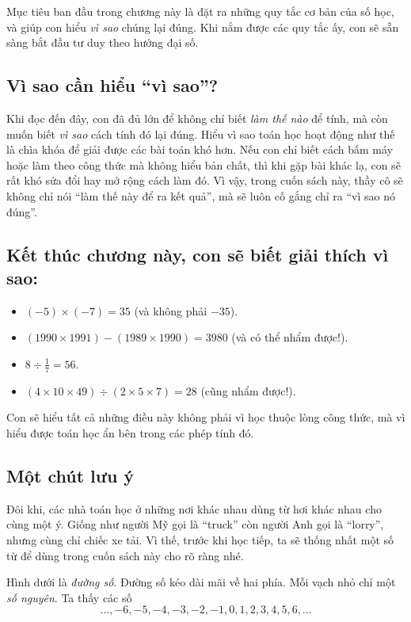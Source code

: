 \documentclass[14pt,a4paper]{extbook}
\begin{document}
Mục tiêu ban đầu trong chương này là đặt ra những quy tắc cơ bản của
số học, và giúp con hiểu \emph{vì sao} chúng lại đúng. Khi nắm được
các quy tắc ấy, con sẽ sẵn sàng bắt đầu tư duy theo hướng đại số.

\subsection*{Vì sao cần hiểu “vì sao”?}
Khi đọc đến đây, con đã đủ lớn để không chỉ biết \emph{làm thế nào}
để tính, mà còn muốn biết \emph{vì sao} cách tính đó lại đúng. Hiểu
vì sao toán học hoạt động như thế là chìa khóa để giải được các bài
toán khó hơn. Nếu con chỉ biết cách bấm máy hoặc làm theo công thức mà
không hiểu bản chất, thì khi gặp bài khác lạ, con sẽ rất khó sửa đổi
hay mở rộng cách làm đó. Vì vậy, trong cuốn sách này, thầy cô sẽ không
chỉ nói “làm thế này để ra kết quả”, mà sẽ luôn cố gắng chỉ ra “vì sao
nó đúng”.

\subsection*{Kết thúc chương này, con sẽ biết giải thích vì sao:}
\begin{itemize}
  \item $(-5)\times(-7)=35$ (và không phải $-35$).
  \item $(1990\times1991)-(1989\times1990)=3980$ (và có thể nhẩm được!).
  \item $8\div\tfrac{1}{7}=56$.
  \item $(4\times10\times49)\div(2\times5\times7)=28$ (cũng nhẩm được!).
\end{itemize}

Con sẽ hiểu tất cả những điều này không phải vì học thuộc lòng công
thức, mà vì hiểu được toán học ẩn bên trong các phép tính đó.

\subsection*{Một chút lưu ý}
Đôi khi, các nhà toán học ở những nơi khác nhau dùng từ hơi khác nhau
cho cùng một ý. Giống như người Mỹ gọi là “truck” còn người Anh gọi là
“lorry”, nhưng cùng chỉ chiếc xe tải. Vì thế, trước khi học tiếp, ta
sẽ thống nhất một số từ để dùng trong cuốn sách này cho rõ ràng nhé.


Hình dưới là \emph{đường số}. Đường số kéo dài mãi về hai phía.
Mỗi vạch nhỏ chỉ một \emph{số nguyên}. Ta thấy các số
\[
\ldots,-6,-5,-4,-3,-2,-1,0,1,2,3,4,5,6,\ldots
\]
\end{document}

